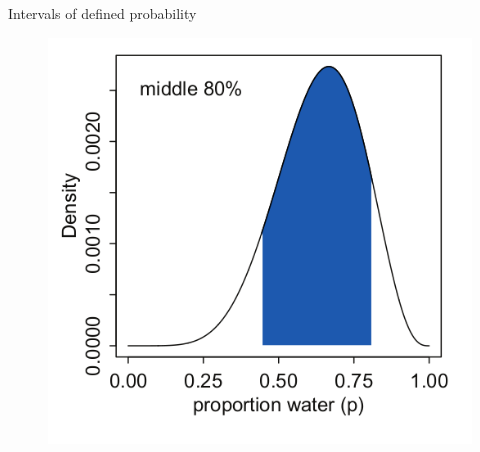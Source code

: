 \documentclass[handout]{beamer}
\begin{document}
\begin{frame}{Intervals of defined probability}
\scriptsize{

   \begin{figure}[h!]
	\centering
	\includegraphics[scale=0.45]{pics/interval4.png}
	\end{figure} 




} 

\end{frame}
\end{document}
